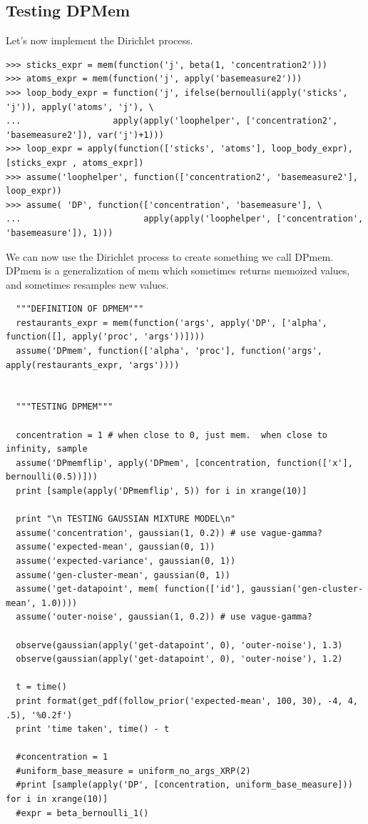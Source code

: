\documentclass[11pt]{article}
\begin{document}
\subsection{Testing DPMem}

Let's now implement the Dirichlet process.  

\begin{small}
\begin{verbatim}
>>> sticks_expr = mem(function('j', beta(1, 'concentration2')))
>>> atoms_expr = mem(function('j', apply('basemeasure2')))
>>> loop_body_expr = function('j', ifelse(bernoulli(apply('sticks', 'j')), apply('atoms', 'j'), \
...                  apply(apply('loophelper', ['concentration2', 'basemeasure2']), var('j')+1)))
>>> loop_expr = apply(function(['sticks', 'atoms'], loop_body_expr), [sticks_expr , atoms_expr])
>>> assume('loophelper', function(['concentration2', 'basemeasure2'], loop_expr))
>>> assume( 'DP', function(['concentration', 'basemeasure'], \
...                        apply(apply('loophelper', ['concentration', 'basemeasure']), 1)))
\end{verbatim}
\end{small}

We can now use the Dirichlet process to create something we call DPmem.  DPmem is a generalization of mem which sometimes returns memoized values, and sometimes resamples new values.  

\begin{small}
\begin{verbatim}
  """DEFINITION OF DPMEM"""
  restaurants_expr = mem(function('args', apply('DP', ['alpha', function([], apply('proc', 'args'))])))
  assume('DPmem', function(['alpha', 'proc'], function('args', apply(restaurants_expr, 'args'))))


  """TESTING DPMEM"""

  concentration = 1 # when close to 0, just mem.  when close to infinity, sample 
  assume('DPmemflip', apply('DPmem', [concentration, function(['x'], bernoulli(0.5))]))
  print [sample(apply('DPmemflip', 5)) for i in xrange(10)]

  print "\n TESTING GAUSSIAN MIXTURE MODEL\n"
  assume('concentration', gaussian(1, 0.2)) # use vague-gamma? 
  assume('expected-mean', gaussian(0, 1)) 
  assume('expected-variance', gaussian(0, 1))
  assume('gen-cluster-mean', gaussian(0, 1))
  assume('get-datapoint', mem( function(['id'], gaussian('gen-cluster-mean', 1.0))))
  assume('outer-noise', gaussian(1, 0.2)) # use vague-gamma?

  observe(gaussian(apply('get-datapoint', 0), 'outer-noise'), 1.3)
  observe(gaussian(apply('get-datapoint', 0), 'outer-noise'), 1.2)

  t = time()
  print format(get_pdf(follow_prior('expected-mean', 100, 30), -4, 4, .5), '%0.2f')
  print 'time taken', time() - t

  #concentration = 1
  #uniform_base_measure = uniform_no_args_XRP(2)
  #print [sample(apply('DP', [concentration, uniform_base_measure])) for i in xrange(10)]
  #expr = beta_bernoulli_1()

\end{verbatim}
\end{small}
\end{document}
